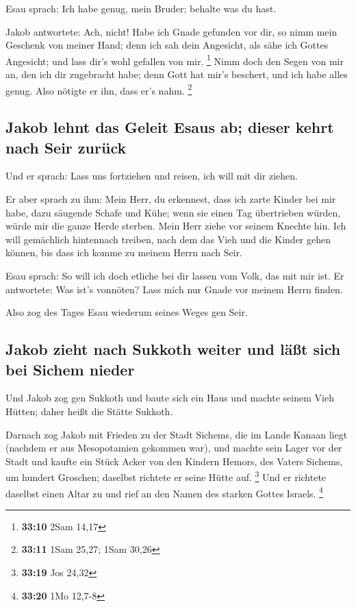  Esau sprach: Ich habe genug, mein Bruder; behalte was du
hast.

 Jakob antwortete: Ach, nicht! Habe ich Gnade gefunden
vor dir, so nimm mein Geschenk von meiner Hand; denn ich sah dein
Angesicht, als sähe ich Gottes Angesicht; und lass dir's wohl gefallen
von mir. \footnote{\textbf{33:10} 2Sam 14,17}  Nimm doch
den Segen von mir an, den ich dir zugebracht habe; denn Gott hat mir's
beschert, und ich habe alles genug. Also nötigte er ihn, dass er's nahm.
\footnote{\textbf{33:11} 1Sam 25,27; 1Sam 30,26}

\hypertarget{jakob-lehnt-das-geleit-esaus-ab-dieser-kehrt-nach-seir-zuruxfcck}{%
\subsection{Jakob lehnt das Geleit Esaus ab; dieser kehrt nach Seir
zurück}\label{jakob-lehnt-das-geleit-esaus-ab-dieser-kehrt-nach-seir-zuruxfcck}}

 Und er sprach: Lass uns fortziehen und reisen, ich will
mit dir ziehen.

 Er aber sprach zu ihm: Mein Herr, du erkennest, dass ich
zarte Kinder bei mir habe, dazu säugende Schafe und Kühe; wenn sie einen
Tag übertrieben würden, würde mir die ganze Herde sterben.
 Mein Herr ziehe vor seinem Knechte hin. Ich will
gemächlich hintennach treiben, nach dem das Vieh und die Kinder gehen
können, bis dass ich komme zu meinem Herrn nach Seir.

 Esau sprach: So will ich doch etliche bei dir lassen vom
Volk, das mit mir ist. Er antwortete: Was ist's vonnöten? Lass mich nur
Gnade vor meinem Herrn finden.

 Also zog des Tages Esau wiederum seines Weges gen Seir.

\hypertarget{jakob-zieht-nach-sukkoth-weiter-und-luxe4uxdft-sich-bei-sichem-nieder}{%
\subsection{Jakob zieht nach Sukkoth weiter und läßt sich bei Sichem
nieder}\label{jakob-zieht-nach-sukkoth-weiter-und-luxe4uxdft-sich-bei-sichem-nieder}}

 Und Jakob zog gen Sukkoth und baute sich ein Haus und
machte seinem Vieh Hütten; daher heißt die Stätte Sukkoth.

 Darnach zog Jakob mit Frieden zu der Stadt Sichems, die
im Lande Kanaan liegt (nachdem er aus Mesopotamien gekommen war), und
machte sein Lager vor der Stadt  und kaufte ein Stück
Acker von den Kindern Hemors, des Vaters Sichems, um hundert Groschen;
daselbst richtete er seine Hütte auf. \footnote{\textbf{33:19} Jos 24,32}
 Und er richtete daselbst einen Altar zu und rief an den
Namen des starken Gottes Israels. \footnote{\textbf{33:20} 1Mo 12,7-8}

